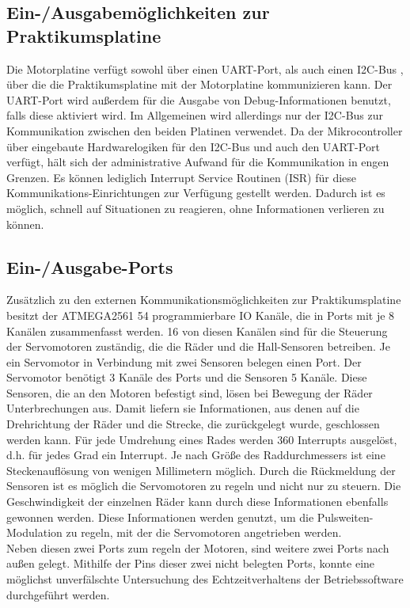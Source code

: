 \subsection{Ein-/Ausgabemöglichkeiten zur Praktikumsplatine}
Die Motorplatine verfügt sowohl über einen UART-Port, als auch einen I2C-Bus \cite{I2C_WIKI}, über die
die Praktikumsplatine mit der Motorplatine kommunizieren kann. Der UART-Port wird außerdem
für die Ausgabe von Debug-Informationen benutzt, falls diese aktiviert wird. Im Allgemeinen
wird allerdings nur der I2C-Bus zur Kommunikation zwischen den beiden Platinen verwendet.
Da der Mikrocontroller über eingebaute Hardwarelogiken für den I2C-Bus und auch
den UART-Port verfügt, hält sich der administrative Aufwand für die Kommunikation in engen
Grenzen. Es können lediglich Interrupt Service Routinen (ISR) für diese Kommunikations-Einrichtungen zur Verfügung gestellt
werden. Dadurch ist es möglich, schnell auf Situationen zu reagieren, ohne Informationen verlieren zu können.
\subsection{Ein-/Ausgabe-Ports}
Zusätzlich zu den externen Kommunikationsmöglichkeiten zur Praktikumsplatine besitzt der ATMEGA2561 54
programmierbare IO Kanäle, die in Ports mit je 8 Kanälen zusammenfasst werden. 16 von diesen
Kanälen sind für die Steuerung der Servomotoren zuständig, die die Räder und die Hall-Sensoren betreiben.
Je ein Servomotor in Verbindung mit zwei Sensoren belegen einen Port. Der Servomotor benötigt 3 Kanäle
des Ports und die Sensoren 5 Kanäle.
Diese Sensoren, die an den Motoren befestigt sind, lösen bei Bewegung der Räder Unterbrechungen aus.
Damit liefern sie Informationen, aus denen auf die Drehrichtung der Räder und die Strecke, die zurückgelegt wurde,
geschlossen werden kann.
Für jede Umdrehung eines Rades werden 360 Interrupts ausgelöst, d.h. für jedes Grad ein Interrupt. Je
nach Größe des Raddurchmessers ist eine Steckenauflösung von wenigen Millimetern möglich.
Durch die Rückmeldung der Sensoren ist es möglich die Servomotoren zu regeln und nicht nur zu steuern.
Die Geschwindigkeit der einzelnen Räder kann durch diese Informationen ebenfalls gewonnen werden.
Diese Informationen werden genutzt, um die Pulsweiten-Modulation zu regeln, mit der die Servomotoren angetrieben
werden.\\
Neben diesen zwei Ports zum regeln der Motoren, sind weitere zwei Ports nach außen gelegt. Mithilfe
der Pins dieser zwei nicht belegten Ports, konnte eine möglichst unverfälschte Untersuchung des
Echtzeitverhaltens der Betriebssoftware durchgeführt werden.

